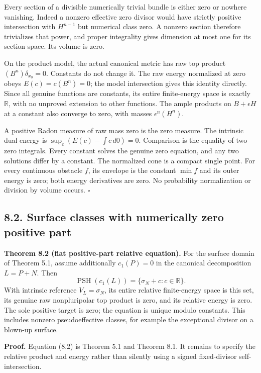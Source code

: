 \documentclass[
  10pt,
]{article}
\begin{document}
Every section of a divisible numerically trivial bundle is either zero
or nowhere vanishing. Indeed a nonzero effective zero divisor would have
strictly positive intersection with \(H^{n-1}\) but numerical class
zero. A nonzero section therefore trivializes that power, and proper
integrality gives dimension at most one for its section space. Its
volume is zero.

On the product model, the actual canonical metric has raw top product
\((B^n)\delta_{x_0}=0\). Constants do not change it. The raw energy
normalized at zero obeys \(E(c)=c(B^n)=0\); the model intersection gives
this identity directly. Since all genuine functions are constants, its
entire finite-energy space is exactly \(\mathbb R\), with no unproved
extension to other functions. The ample products on \(B+\epsilon H\) at
a constant also converge to zero, with masses \(\epsilon^n(H^n)\).

A positive Radon measure of raw mass zero is the zero measure. The
intrinsic dual energy is \(\sup_c(E(c)-\int c\,d0)=0\). Comparison is
the equality of two zero integrals. Every constant solves the genuine
zero equation, and any two solutions differ by a constant. The
normalized cone is a compact single point. For every continuous obstacle
\(f\), its envelope is the constant \(\min f\) and its outer energy is
zero; both energy derivatives are zero. No probability normalization or
division by volume occurs. \(\square\)

\subsection{8.2. Surface classes with numerically zero positive
part}\label{surface-classes-with-numerically-zero-positive-part}

\textbf{Theorem 8.2 (flat positive-part relative equation).} For the
surface domain of Theorem 5.1, assume additionally \(c_1(P)=0\) in the
canonical decomposition \(L=P+N\). Then \[
 \operatorname{PSH}(c_1(L))=\{\sigma_N+c:c\in\mathbb R\}.
                                                               \tag{8.2}
\] With intrinsic reference \(V_L=\sigma_N\), its entire relative
finite-energy space is this set, its genuine raw nonpluripolar top
product is zero, and its relative energy is zero. The sole positive
target is zero; the equation is unique modulo constants. This includes
nonzero pseudoeffective classes, for example the exceptional divisor on
a blown-up surface.

\textbf{Proof.} Equation (8.2) is Theorem 5.1 and Theorem 8.1. It
remains to specify the relative product and energy rather than silently
using a signed fixed-divisor self-intersection.
\end{document}
